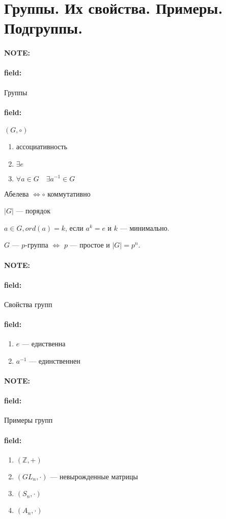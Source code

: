 \documentclass[12pt]{article}
\newenvironment{note}{\paragraph{NOTE:}}{}
\newenvironment{field}{\paragraph{field:}}{}
\begin{document}
\section{Группы. Их свойства. Примеры. Подгруппы.}

\begin{note}
  \begin{field}
    Группы
  \end{field}
  \begin{field}
    $(G, \circ)$
    \begin{enumerate}
      \item
      ассоциативность
      \item
      $\exists e$
      \item
      $\forall a \in G \quad{} \exists a^{-1} \in G$
    \end{enumerate}

    Абелева $\Leftrightarrow \circ$ коммутативно

    $|G|$ --- порядок

    $a \in G, ord(a) = k$, если $a^{k} = e$ и $k$ --- минимально.

    $G$ --- $p$-группа $\Leftrightarrow$ $p$ --- простое и $|G| = p^{n}$.
  \end{field}
\end{note}

\begin{note}
  \begin{field}
    Свойства групп
  \end{field}
  \begin{field}
    \begin{enumerate}
      \item
      $e$ --- едиственна
      \item
      $a^{-1}$ --- единственнен
    \end{enumerate}
  \end{field}
\end{note}

\begin{note}
  \begin{field}
    Примеры групп
  \end{field}
  \begin{field}
    \begin{enumerate}
      \item
      $(\mathbb{Z}, +)$
      \item
      $(GL_{n}, \cdot)$ --- невырожденные матрицы
      \item
      $(S_{n}, \cdot)$
      \item
      $(A_{n}, \cdot)$
    \end{enumerate}
  \end{field}
\end{note}
\end{document}
